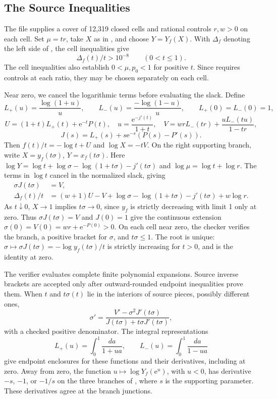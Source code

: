 \documentclass[11pt]{article}
\theoremstyle{definition}
\newcommand{\e}{\mathrm e}
\begin{document}
\subsection{The Source Inequalities}\label{sec:source-verification}
The file  supplies a cover of 12,319 closed cells and rational controls \(r,w>0\) on each cell.
Set \(\mu=tr\), take \(X\) as in , and choose \(Y=Y_f(X)\).
With \(\Delta_f\) denoting the left side of , the cell inequalities give
\[
 \Delta_f(t)/t>10^{-8}\qquad(0<t\le1).
\]
The cell inequalities also establish \(0<\mu,p_0<1\) for positive \(t\). Since  requires controls at each ratio, they may be chosen separately on each cell.

Near zero, we cancel the logarithmic terms before evaluating the slack. Define
\[
 L_+(u)=\frac{\log(1+u)}u,\qquad L_-(u)=\frac{-\log(1-u)}u,
 \qquad L_+(0)=L_-(0)=1,
\]
\[
 U=(1+t)L_+(t)+\e^{-t}P(t),\quad
 u=\frac{\e^{-j'(t)}}{1+t},\quad
 V=wrL_-(tr)+\frac{uL_-(tu)}{1-tr},
\]
\[
 J(s)=L_+(s)+s\e^{-s}(P(s)-P'(s)).
\]
Then \(f(t)/t=-\log t+U\) and \(\log X=-tV\).
On the right supporting branch, write \(X=y_f(t\sigma)\), \(Y=x_f(t\sigma)\).
Here \(\log Y=\log t+\log\sigma-\log(1+t\sigma)-j'(t\sigma)\) and \(\log\mu=\log t+\log r\).
The terms in \(\log t\) cancel in the normalized slack, giving
\begin{align*}
 \sigma J(t\sigma)&=V,\\
 \Delta_f(t)/t&=(w+1)U-V+\log\sigma-\log(1+t\sigma)
                -j'(t\sigma)+w\log r.
\end{align*}
As \(t\downarrow0\), \(X\to1\) implies \(t\sigma\to0\), since \(y_f\) is strictly decreasing with limit 1 only at zero. Thus \(\sigma J(t\sigma)=V\) and \(J(0)=1\) give the continuous extension \(\sigma(0)=V(0)=wr+\e^{-P(0)}>0\). On each cell near zero, the checker verifies the branch, a positive bracket for \(\sigma\), and \(t\sigma\le1\). The root is unique: \(\sigma\mapsto\sigma J(t\sigma)=-\log y_f(t\sigma)/t\) is strictly increasing for \(t>0\), and is the identity at zero.

The verifier evaluates complete finite polynomial expansions. Source inverse brackets are accepted only after outward-rounded endpoint inequalities prove them. When \(t\) and \(t\sigma(t)\) lie in the interiors of source pieces, possibly different ones,
\[
 \sigma'=\frac{V'-\sigma^2J'(t\sigma)}{J(t\sigma)+t\sigma J'(t\sigma)},
\]
with a checked positive denominator. The integral representations
\[
 L_+(u)=\int_0^1\frac{da}{1+ua},\qquad
 L_-(u)=\int_0^1\frac{da}{1-ua}
\]
give endpoint enclosures for these functions and their derivatives, including at zero. Away from zero, the function $u\mapsto\log Y_f(\e^u)$, with $u<0$, has derivative \(-s\), \(-1\), or \(-1/s\) on the three branches of , where $s$ is the supporting parameter. These derivatives agree at the branch junctions.
\end{document}
